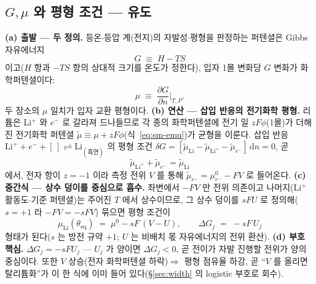 \documentclass[11pt,a4paper]{article}
\newcommand{\dd}{\mathrm{d}}
\newcommand{\eq}{\mathrm{eq}}
\begin{document}
\subsection{$G,\mu$ 와 평형 조건 — 유도}
\textbf{(a) 출발 — 두 정의.} 등온$\cdot$등압 계(전지)의 자발성$\cdot$평형을 판정하는 퍼텐셜은 Gibbs 자유에너지
\begin{equation}
G\;\equiv\;H-TS
\label{eq:gibbsdef}
\end{equation}
이고($H$ 항과 $-TS$ 항의 상대적 크기를 온도가 정한다), 입자 1몰 변화당 $G$ 변화가 화학퍼텐셜이다:
\begin{equation}
\mu\;\equiv\;\frac{\partial G}{\partial n}\Big|_{T,P}.
\label{eq:mudef}
\end{equation}
두 장소의 $\mu$ 일치가 입자 교환 평형이다. \textbf{(b) 연산 — 삽입 반응의 전기화학 평형.} 리튬은 Li$^+$ 와 $e^-$ 로
갈라져 드나들므로 각 종의 화학퍼텐셜에 전기 일 $zF\phi$(1몰)가 더해진 전기화학 퍼텐셜 $\tilde\mu\equiv\mu+zF\phi$(식~\eqref{eq:sm-emu})가 균형을
이룬다. 삽입 반응 $\mathrm{Li}^++e^-+[\,]\rightleftharpoons\mathrm{Li}_{(\text{흑연})}$ 의 평형 조건
$\delta G=[\tilde\mu_\mathrm{Li}-\tilde\mu_{\mathrm{Li}^+}-\tilde\mu_{e^-}]\,\dd n=0$, 곧
\begin{equation}
\tilde\mu_{\mathrm{Li}^+}+\tilde\mu_{e^-}=\tilde\mu_\mathrm{Li}
\label{eq:eqbalance}
\end{equation}
에서, 전자 항이 $z=-1$ 이라 측정 전위 $V$ 를 통해 $\tilde\mu_{e^-}=\mu_{e^-}^0-FV$ 로 들어온다. \textbf{(c) 중간식 —
상수 덩이를 중심으로 흡수.} 좌변에서 $-FV$ 만 전위 의존이고 나머지(Li$^+$ 활동도$\cdot$기준 퍼텐셜)는 주어진 $T$ 에서
상수이므로, 그 상수 덩이를 $sFU$ 로 정의해($s=+1$ 라 $-FV=-sFV$) 묶으면 평형 조건이
\begin{equation}
\mu_\mathrm{Li}(\theta_\eq)\;=\;\mu^0-sF\,(V-U),
\qquad \Delta G_j\;=\;-sF\,U_j
\label{eq:eqcond}
\end{equation}
형태가 된다($s$ 는 방전 규약 $+1$; $U$ 는 비배치 몫 자유에너지의 전위 환산). \textbf{(d) 부호 핵심.} $\Delta G_j=-sFU_j$ —
$U_j$ 가 양이면 $\Delta G_j<0$, 곧 전이가 자발 진행할 전위가 양의 중심이다. 또한 $V$ 상승(전자 화학퍼텐셜 하락)$\Rightarrow$
평형 점유율 하강, 곧 ``$V$ 를 올리면 탈리튬화''가 이 한 식에 이미 들어 있다(\S\ref{sec:width} 의 logistic 부호로 회수).
\end{document}
